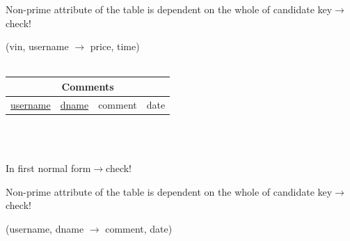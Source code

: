 \documentclass[12pt]{article}
\begin{document}
\par Non-prime attribute of the table is dependent on the whole of candidate key\hfill$\rightarrow$check!
\par (vin, username $\rightarrow$ price, time)\\
~\\
\begin{tabularx}{\textwidth}{|X|X|X|X|}
\hline
\multicolumn{4}{|c|}{\cellcolor{green!25}Comments}\\\hline
\cellcolor{green!25}\underline{username} & \cellcolor{green!25}\underline{dname} & \cellcolor{green!25}comment & \cellcolor{green!25}date\\\hline
\end{tabularx}
~\\~\\
\par In first normal form\hfill$\rightarrow$check!
\par Non-prime attribute of the table is dependent on the whole of candidate key\hfill$\rightarrow$check!
\par (username, dname $\rightarrow$ comment, date)\\
\end{document}
